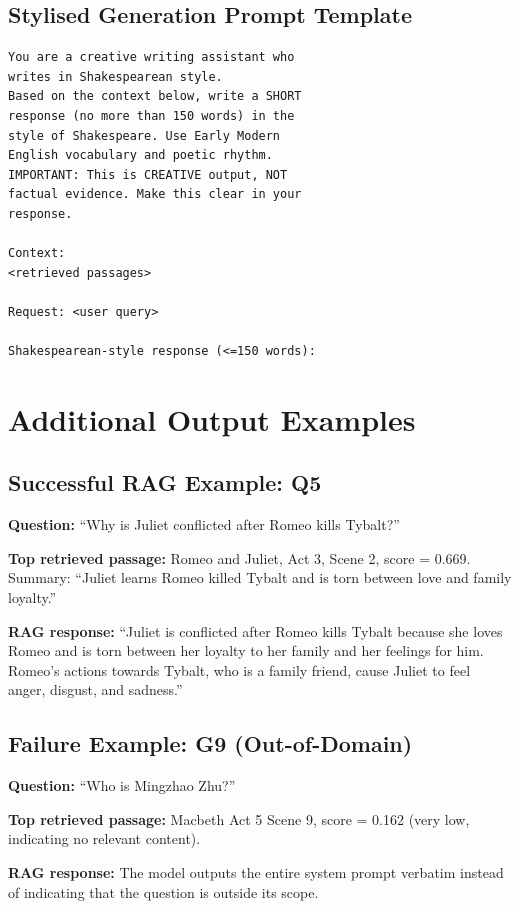\documentclass[10pt,conference]{IEEEtran}
\begin{document}
\subsection{Stylised Generation Prompt Template}

\begin{lstlisting}[language={}]
You are a creative writing assistant who
writes in Shakespearean style.
Based on the context below, write a SHORT
response (no more than 150 words) in the
style of Shakespeare. Use Early Modern
English vocabulary and poetic rhythm.
IMPORTANT: This is CREATIVE output, NOT
factual evidence. Make this clear in your
response.

Context:
<retrieved passages>

Request: <user query>

Shakespearean-style response (<=150 words):
\end{lstlisting}

\section{Additional Output Examples}
\label{app:outputs}

\subsection{Successful RAG Example: Q5}

\textbf{Question:} ``Why is Juliet conflicted after Romeo kills Tybalt?''

\textbf{Top retrieved passage:} Romeo and Juliet, Act 3, Scene 2, score = 0.669. Summary: ``Juliet learns Romeo killed Tybalt and is torn between love and family loyalty.''

\textbf{RAG response:} ``Juliet is conflicted after Romeo kills Tybalt because she loves Romeo and is torn between her loyalty to her family and her feelings for him. Romeo's actions towards Tybalt, who is a family friend, cause Juliet to feel anger, disgust, and sadness.''

\subsection{Failure Example: G9 (Out-of-Domain)}

\textbf{Question:} ``Who is Mingzhao Zhu?''

\textbf{Top retrieved passage:} Macbeth Act 5 Scene 9, score = 0.162 (very low, indicating no relevant content).

\textbf{RAG response:} The model outputs the entire system prompt verbatim instead of indicating that the question is outside its scope.
\end{document}
